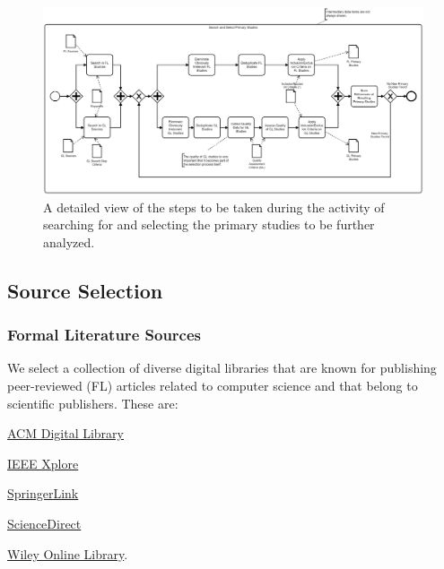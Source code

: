 \documentclass[review]{elsarticle}
\begin{document}
\begin{figure}
	\includegraphics[width=\linewidth]{graphics/search-and-select}
	\caption[Search and select]{A detailed view of the steps to be taken during the activity of searching for and selecting the primary studies to be further analyzed.}
	\label{fig:search-and-select}
\end{figure}

\subsection{Source Selection}
\subsubsection{Formal Literature Sources}
We select a collection of diverse digital libraries that are known for publishing peer-reviewed (FL) articles related to computer science and that belong to scientific publishers.
These are:
\begin{inparaenum}[(i)]
	\item \href{https://dl.acm.org/}{ACM Digital Library}
	\item \href{https://ieeexplore.ieee.org/Xplore/home.jsp}{IEEE Xplore}
	\item \href{https://link.springer.com/}{SpringerLink}
	\item \href{https://www.sciencedirect.com/}{ScienceDirect}
	\item \href{https://onlinelibrary.wiley.com/}{Wiley Online Library}.
\end{inparaenum}
\end{document}

